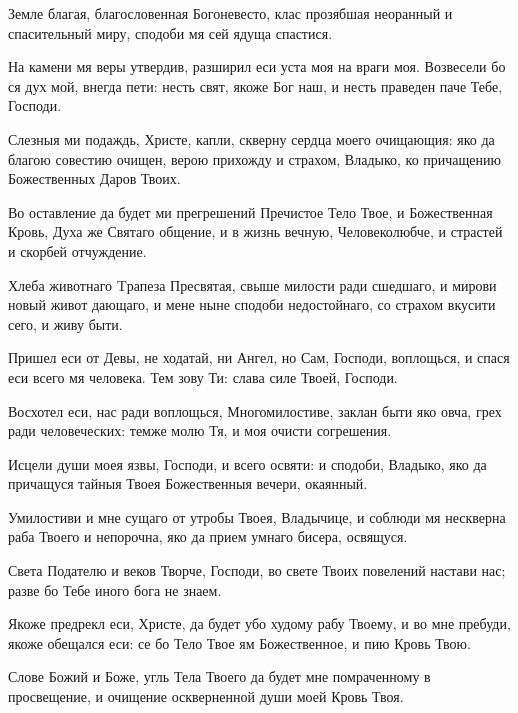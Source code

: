 
Земле благая, благословенная Богоневесто, клас прозябшая неоранный и спасительный миру, сподоби мя сей ядуща спастися.




На камени мя веры утвердив, разширил еси уста моя на враги моя. Возвесели бо ся дух мой, внегда пети: несть свят, якоже Бог наш, и несть праведен паче Тебе, Господи.


Слезныя ми подаждь, Христе, капли, скверну сердца моего очищающия: яко да благою совестию очищен, верою прихожду и страхом, Владыко, ко причащению Божественных Даров Твоих.


Во оставление да будет ми прегрешений Пречистое Тело Твое, и Божественная Кровь, Духа же Святаго общение, и в жизнь вечную, Человеколюбче, и страстей и скорбей отчуждение.



Хлеба животнаго Tрапеза Пресвятая, свыше милости ради сшедшаго, и мирови новый живот дающаго, и мене ныне сподоби недостойнаго, со страхом вкусити сего, и живу быти.




Пришел еси от Девы, не ходатай, ни Ангел, но Сам, Господи, воплощься, и спася еси всего мя человека. Тем зову Ти: слава силе Твоей, Господи.


Восхотел еси, нас ради воплощься, Многомилостиве, заклан быти яко овча, грех ради человеческих: темже молю Тя, и моя очисти согрешения.


Исцели души моея язвы, Господи, и всего освяти: и сподоби, Владыко, яко да причащуся тайныя Твоея Божественныя вечери, окаянный.



Умилостиви и мне сущаго от утробы Твоея, Владычице, и соблюди мя нескверна раба Твоего и непорочна, яко да прием умнаго бисера, освящуся.




Света Подателю и веков Творче, Господи, во свете Твоих повелений настави нас; разве бо Тебе иного бога не знаем.


Якоже предрекл еси, Христе, да будет убо худому рабу Твоему, и во мне пребуди, якоже обещался еси: се бо Тело Твое ям Божественное, и пию Кровь Твою.


Слове Божий и Боже, угль Тела Твоего да будет мне помраченному в просвещение, и очищение оскверненной души моей Кровь Твоя.


